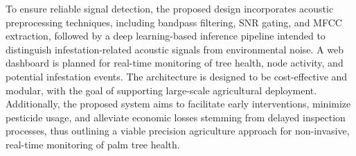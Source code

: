 \documentclass[12pt,a4paper,oneside]{memoir}
\begin{document}
To ensure reliable signal detection, the proposed design incorporates acoustic preprocessing techniques, including bandpass filtering, SNR gating, and MFCC extraction, followed by a deep learning-based inference pipeline intended to distinguish infestation-related acoustic signals from environmental noise. A web dashboard is planned for real-time monitoring of tree health, node activity, and potential infestation events. The architecture is designed to be cost-effective and modular, with the goal of supporting large-scale agricultural deployment. Additionally, the proposed system aims to facilitate early interventions, minimize pesticide usage, and alleviate economic losses stemming from delayed inspection processes, thus outlining a viable precision agriculture approach for non-invasive, real-time monitoring of palm tree health.

\clearpage

\tableofcontents* \clearpage

\listoffigures
\clearpage

\listoftables
\clearpage

\end{document}
